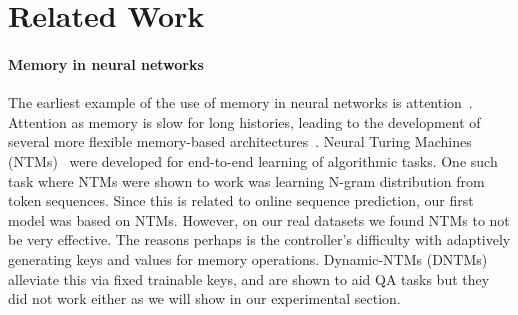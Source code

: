\documentclass[letterpaper]{article} %
\begin{document}
\section{Related Work}

\paragraph{Memory in neural networks}
The earliest example of the use of memory in neural networks is attention~.
Attention as memory is slow for long histories, leading to the development of several more flexible memory-based architectures~\cite{Weston16}.
Neural Turing Machines (NTMs)~\cite{GravesNTM} were developed for end-to-end learning of algorithmic tasks. One such task where NTMs were shown to work was learning N-gram distribution from token sequences. Since this is related to online sequence prediction, our first model was based on NTMs.  However, on our real datasets we found NTMs to not be very effective. The reasons perhaps is the controller's difficulty with adaptively generating keys and values for memory operations.  Dynamic-NTMs (DNTMs)~\cite{GulcehreCCB16} alleviate this via fixed trainable keys, and are shown to aid QA tasks but they did not work either as we will show in our experimental section.
\end{document}
